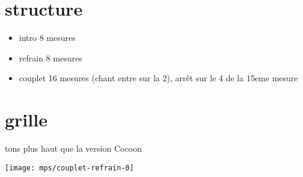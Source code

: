 \documentclass[11pt]{article}
\begin{document}
    \makesongtitle


    \section{structure}

    \begin{itemize}[noitemsep]
        \item     intro 8 mesures
        \item     refrain 8 mesures
        \item     couplet 16 mesures (chant entre sur la 2), arr\^et sur le 4 de la 15eme mesure
    \end{itemize}


    \section{grille}

    \textonehalf{}  tons plus haut que la version Cocoon

    \texttt{[image: mps/couplet-refrain-0]}

    




%    


%    
\end{document}
